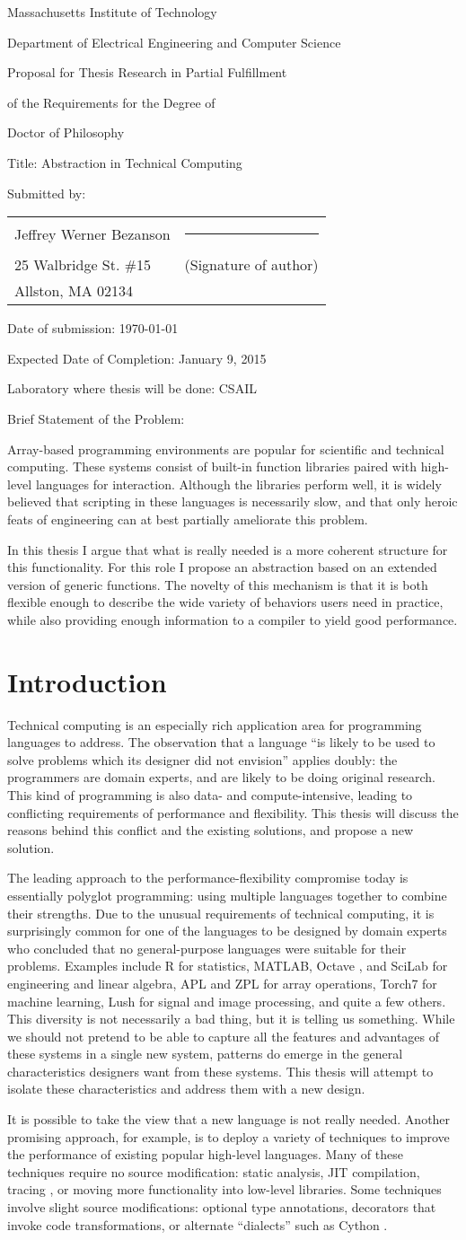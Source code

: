 \documentclass[12pt]{article}
\author & \signatureline \\
\def\author{Jeffrey Werner Bezanson}
\def\addressone{25 Walbridge St. \#15}
\def\addresstwo{Allston, MA 02134}
\def\title{Abstraction in Technical Computing}
\def\expectedcompletetiondate{January 9, 2015}
\def\briefproblemstatement{

Array-based programming environments are popular for scientific and
technical computing.
These systems consist of built-in function libraries paired with high-level
languages for interaction.
Although the libraries perform well, it is widely believed that scripting in these
languages is necessarily slow, and that only heroic feats of engineering can at
best partially ameliorate this problem.

In this thesis I argue that what is really needed is a more coherent
structure for this functionality. For this role I propose an abstraction
based on an extended version of generic functions. The novelty of this
mechanism is that it is both flexible enough to describe the wide
variety of behaviors users need in practice, while also providing
enough information to a compiler to yield good performance.
















}
\def\signatureline{\rule{2.5in}{0.25pt}}
\def\thesisproposalform{
\begin{center}
Massachusetts Institute of Technology

Department of Electrical Engineering and Computer Science

\bigskip

Proposal for Thesis Research in Partial Fulfillment

of the Requirements for the Degree of 

Doctor of Philosophy
\end{center}

\bigskip

Title:  \title

Submitted by: \hfill
\begin{tabular}[t]{p{0.3\textwidth}p{0.4\textwidth}}
\author & \signatureline \\
\addressone & (Signature of author) \\
\addresstwo \\
\end{tabular}

Date of submission:  \today

Expected Date of Completion:  \expectedcompletetiondate

Laboratory where thesis will be done: CSAIL

Brief Statement of the Problem:

\briefproblemstatement 

 \newpage }
\begin{document}
\thesisproposalform

\newpage

\section{Introduction}

Technical computing is an especially rich application area for programming
languages to address. The observation that a language ``is likely to be used to
solve problems which its designer did not envision'' \cite{Liskov:1974pb}
applies doubly: the programmers are domain experts, and are likely to be
doing original research. This kind of programming is also data- and
compute-intensive, leading to conflicting requirements of performance and
flexibility. This thesis will discuss the reasons behind this conflict and
the existing solutions, and propose a new solution.

The leading approach to the performance-flexibility compromise today is
essentially polyglot programming: using multiple languages together to
combine their strengths. Due to the unusual requirements of technical
computing, it is surprisingly common for one of the languages to be
designed by domain experts who concluded that no general-purpose
languages were suitable for their problems. Examples include R \cite{Rlang}
for statistics, MATLAB\textregistered, Octave \cite{octave},
and SciLab \cite{scilab} for engineering and linear algebra, APL \cite{APL}
and ZPL \cite{ZPL} for array operations, Torch7 \cite{collobert2011torch7}
for machine learning, Lush \cite{bottou2002lush} for
signal and image processing, and quite a few others. This diversity is
not necessarily a bad thing, but it is telling us something. While we
should not pretend to be able to capture all the features and advantages
of these systems in a single new system, patterns do emerge in the
general characteristics designers want from these systems. This thesis
will attempt to isolate these characteristics and address them
with a new design.

It is possible to take the view that a new language is not really needed.
Another promising approach, for example, is to deploy a variety of
techniques to improve the performance of existing popular high-level
languages. Many of these techniques require
no source modification: static analysis, JIT compilation, tracing \cite{tracingjit},
or moving more functionality into low-level libraries. Some techniques involve
slight source modifications: optional type annotations, decorators that
invoke code transformations, or alternate ``dialects'' such as Cython
\cite{Behnel:2011}.
\end{document}
